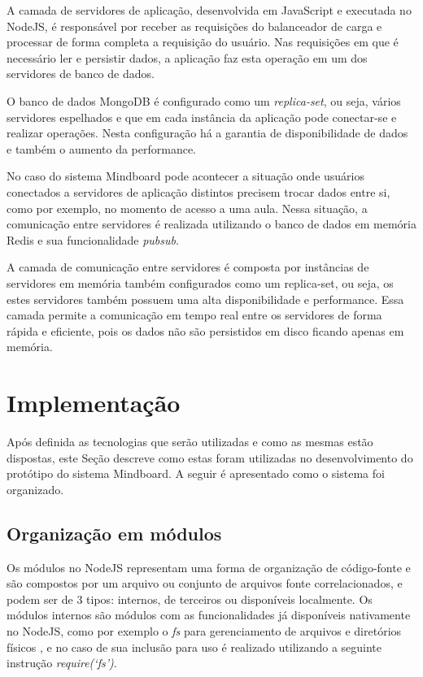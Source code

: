 A camada de servidores de aplicação, desenvolvida em JavaScript e executada no NodeJS, é responsável por receber as requisições do balanceador de carga e processar de forma completa a requisição do usuário. Nas requisições em que é necessário ler e persistir dados, a aplicação faz esta operação em um dos servidores de banco de dados. 

O banco de dados MongoDB é configurado como um \emph{replica-set}, ou seja, vários servidores espelhados e que em cada instância da aplicação pode conectar-se e realizar operações. Nesta configuração há a garantia de disponibilidade de dados e também o aumento da performance.

No caso do sistema Mindboard pode acontecer a situação onde usuários conectados a servidores de aplicação distintos precisem trocar dados entre si, como por exemplo, no momento de acesso a uma aula. Nessa situação, a comunicação entre servidores é realizada utilizando o banco de dados em memória Redis e sua funcionalidade \emph{pubsub}.

A camada de comunicação entre servidores é composta por instâncias de servidores em memória também configurados como um replica-set, ou seja, os estes servidores também possuem uma alta disponibilidade e performance. Essa camada permite a comunicação em tempo real entre os servidores de forma rápida e eficiente, pois os dados não são persistidos em disco ficando apenas em memória.


\section{Implementação}
\label{sec:implementacao}

Após definida as tecnologias que serão utilizadas e como as mesmas estão dispostas, este Seção descreve como estas foram utilizadas no desenvolvimento do protótipo do sistema Mindboard. A seguir é apresentado como o sistema foi organizado.


\subsection{Organização em módulos}
\label{sec:organizacao_mods}

Os módulos no NodeJS representam uma forma de organização de código-fonte e são compostos por um arquivo ou conjunto de arquivos fonte correlacionados, e podem ser de 3 tipos: internos, de terceiros ou disponíveis localmente. Os módulos internos são módulos com as funcionalidades já disponíveis nativamente no NodeJS, como por exemplo o \emph{fs} para gerenciamento de arquivos e diretórios físicos \cite{node_modules}, e no caso de sua inclusão para uso é realizado utilizando a seguinte instrução \emph{require(`fs')}.


